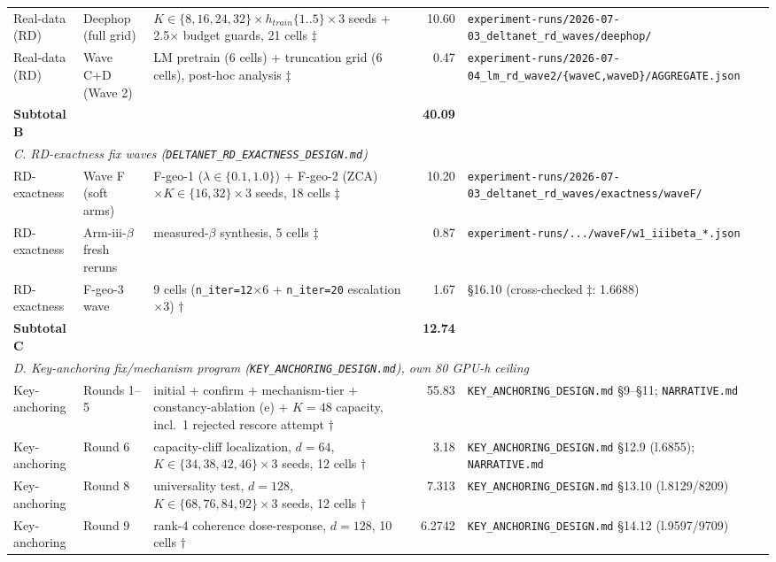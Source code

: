 \begin{table}[htbp]
\begin{tabular}{p{3.6cm}p{3.6cm}p{5.6cm}rl}
Real-data (RD) & Deephop (full grid) & $K\in\{8,16,24,32\}\times h_{train}\{1..5\}\times3$ seeds + 2.5$\times$ budget guards, 21 cells $\ddagger$ & 10.60 & \texttt{experiment-runs/2026-07-03\_deltanet\_rd\_waves/deephop/} \\
Real-data (RD) & Wave C+D (Wave 2) & LM pretrain (6 cells) + truncation grid (6 cells), post-hoc analysis $\ddagger$ & 0.47 & \texttt{experiment-runs/2026-07-04\_lm\_rd\_wave2/\{waveC,waveD\}/AGGREGATE.json} \\
\textbf{Subtotal B} & & & \textbf{40.09} & \\
\midrule
\multicolumn{5}{l}{\textit{C. RD-exactness fix waves (\texttt{DELTANET\_RD\_EXACTNESS\_DESIGN.md})}} \\
RD-exactness & Wave F (soft arms) & F-geo-1 ($\lambda\in\{0.1,1.0\}$) + F-geo-2 (ZCA) $\times K\in\{16,32\}\times3$ seeds, 18 cells $\ddagger$ & 10.20 & \texttt{experiment-runs/2026-07-03\_deltanet\_rd\_waves/exactness/waveF/} \\
RD-exactness & Arm-iii-$\beta$ fresh reruns & measured-$\beta$ synthesis, 5 cells $\ddagger$ & 0.87 & \texttt{experiment-runs/.../waveF/w1\_iiibeta\_*.json} \\
RD-exactness & F-geo-3 wave & 9 cells (\texttt{n\_iter=12}$\times$6 + \texttt{n\_iter=20} escalation$\times$3) $\dagger$ & 1.67 & \S16.10 (cross-checked $\ddagger$: 1.6688) \\
\textbf{Subtotal C} & & & \textbf{12.74} & \\
\midrule
\multicolumn{5}{l}{\textit{D. Key-anchoring fix/mechanism program (\texttt{KEY\_ANCHORING\_DESIGN.md}), own 80 GPU-h ceiling}} \\
Key-anchoring & Rounds 1--5 & initial + confirm + mechanism-tier + constancy-ablation (e) + $K{=}48$ capacity, incl.\ 1 rejected rescore attempt $\dagger$ & 55.83 & \texttt{KEY\_ANCHORING\_DESIGN.md} \S9--\S11; \texttt{NARRATIVE.md} \\
Key-anchoring & Round 6 & capacity-cliff localization, $d{=}64$, $K\in\{34,38,42,46\}\times3$ seeds, 12 cells $\dagger$ & 3.18 & \texttt{KEY\_ANCHORING\_DESIGN.md} \S12.9 (l.6855); \texttt{NARRATIVE.md} \\
Key-anchoring & Round 8 & universality test, $d{=}128$, $K\in\{68,76,84,92\}\times3$ seeds, 12 cells $\dagger$ & 7.313 & \texttt{KEY\_ANCHORING\_DESIGN.md} \S13.10 (l.8129/8209) \\
Key-anchoring & Round 9 & rank-4 coherence dose-response, $d{=}128$, 10 cells $\dagger$ & 6.2742 & \texttt{KEY\_ANCHORING\_DESIGN.md} \S14.12 (l.9597/9709) \\

\end{tabular}
\end{table}
